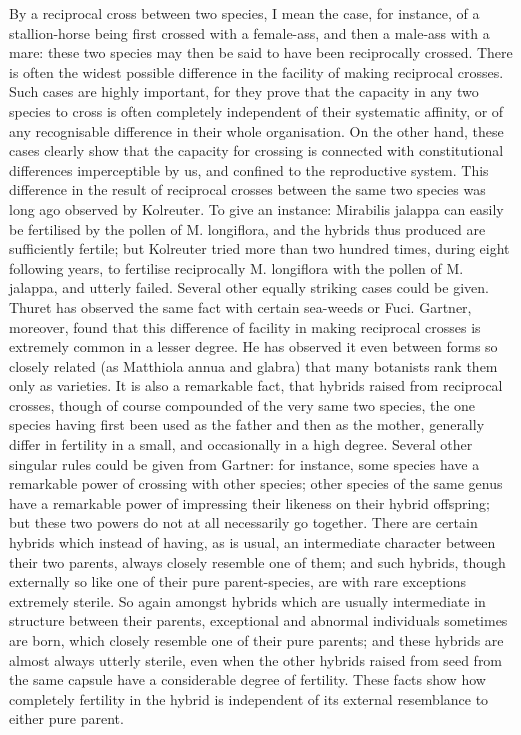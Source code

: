 By a reciprocal cross between two species, I mean the case, for instance, of a stallion-horse being first crossed with a female-ass, and then a male-ass with a mare: these two species may then be said to have been reciprocally crossed. There is often the widest possible difference in the facility of making reciprocal crosses. Such cases are highly important, for they prove that the capacity in any two species to cross is often completely independent of their systematic affinity, or of any recognisable difference in their whole organisation. On the other hand, these cases clearly show that the capacity for crossing is connected with constitutional differences imperceptible by us, and confined to the reproductive system. This difference in the result of reciprocal crosses between the same two species was long ago observed by Kolreuter. To give an instance: Mirabilis jalappa can easily be fertilised by the pollen of M. longiflora, and the hybrids thus produced are sufficiently fertile; but Kolreuter tried more than two hundred times, during eight following years, to fertilise reciprocally M. longiflora with the pollen of M. jalappa, and utterly failed. Several other equally striking cases could be given. Thuret has observed the same fact with certain sea-weeds or Fuci. Gartner, moreover, found that this difference of facility in making reciprocal crosses is extremely common in a lesser degree. He has observed it even between forms so closely related (as Matthiola annua and glabra) that many botanists rank them only as varieties. It is also a remarkable fact, that hybrids raised from reciprocal crosses, though of course compounded of the very same two species, the one species having first been used as the father and then as the mother, generally differ in fertility in a small, and occasionally in a high degree.
Several other singular rules could be given from Gartner: for instance, some species have a remarkable power of crossing with other species; other species of the same genus have a remarkable power of impressing their likeness on their hybrid offspring; but these two powers do not at all necessarily go together. There are certain hybrids which instead of having, as is usual, an intermediate character between their two parents, always closely resemble one of them; and such hybrids, though externally so like one of their pure parent-species, are with rare exceptions extremely sterile. So again amongst hybrids which are usually intermediate in structure between their parents, exceptional and abnormal individuals sometimes are born, which closely resemble one of their pure parents; and these hybrids are almost always utterly sterile, even when the other hybrids raised from seed from the same capsule have a considerable degree of fertility. These facts show how completely fertility in the hybrid is independent of its external resemblance to either pure parent.
